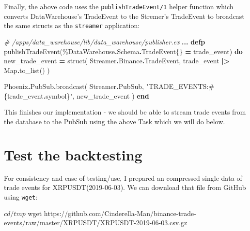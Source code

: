 \documentclass[
]{book}
\newenvironment{Shaded}{\begin{snugshade}}{\end{snugshade}}
\newcommand{\CommentTok}[1]{\textcolor[rgb]{0.56,0.35,0.01}{\textit{#1}}}
\newcommand{\ConstantTok}[1]{\textcolor[rgb]{0.00,0.00,0.00}{#1}}
\newcommand{\ExtensionTok}[1]{#1}
\newcommand{\KeywordTok}[1]{\textcolor[rgb]{0.13,0.29,0.53}{\textbf{#1}}}
\newcommand{\NormalTok}[1]{#1}
\newcommand{\OperatorTok}[1]{\textcolor[rgb]{0.81,0.36,0.00}{\textbf{#1}}}
\newcommand{\OtherTok}[1]{\textcolor[rgb]{0.56,0.35,0.01}{#1}}
\newcommand{\StringTok}[1]{\textcolor[rgb]{0.31,0.60,0.02}{#1}}
\begin{document}
Finally, the above code uses the \texttt{publishTradeEvent/1} helper function which converts DataWarehouse's TradeEvent to the Stremer's TradeEvent to broadcast the same structs as the \texttt{streamer} application:

\begin{Shaded}
\begin{Highlighting}[]
  \CommentTok{\# /apps/data\_warehouse/lib/data\_warehouse/publisher.ex}
  \OperatorTok{...}
  \KeywordTok{defp}\NormalTok{ publishTradeEvent(\%}\ConstantTok{DataWarehouse}\OperatorTok{.}\ConstantTok{Schema}\OperatorTok{.}\ConstantTok{TradeEvent}\NormalTok{\{\} }\OperatorTok{=}\NormalTok{ trade\_event) }\KeywordTok{do}
\NormalTok{    new\_trade\_event }\OperatorTok{=}
\NormalTok{      struct(}
        \ConstantTok{Streamer}\OperatorTok{.}\ConstantTok{Binance}\OperatorTok{.}\ConstantTok{TradeEvent}\NormalTok{,}
\NormalTok{        trade\_event }\OperatorTok{|\textgreater{}} \ConstantTok{Map}\OperatorTok{.}\NormalTok{to\_list()}
\NormalTok{      )}

    \ConstantTok{Phoenix}\OperatorTok{.}\ConstantTok{PubSub}\OperatorTok{.}\NormalTok{broadcast(}
      \ConstantTok{Streamer}\OperatorTok{.}\ConstantTok{PubSub}\NormalTok{,}
      \StringTok{"TRADE\_EVENTS:}\OtherTok{\#\{}\NormalTok{trade\_event}\OperatorTok{.}\NormalTok{symbol}\OtherTok{\}}\StringTok{"}\NormalTok{,}
\NormalTok{      new\_trade\_event}
\NormalTok{    )}
  \KeywordTok{end}
\end{Highlighting}
\end{Shaded}

This finishes our implementation - we should be able to stream trade events from the database to the PubSub using the above Task which we will do below.

\hypertarget{test-the-backtesting}{%
\section{Test the backtesting}\label{test-the-backtesting}}

For consistency and ease of testing/use, I prepared an compressed single data of trade events for XRPUSDT(2019-06-03). We can download that file from GitHub using \texttt{wget}:

\begin{Shaded}
\begin{Highlighting}[]
\ExtensionTok{$}\NormalTok{ cd /tmp}
\ExtensionTok{$}\NormalTok{ wget https://github.com/Cinderella{-}Man/binance{-}trade{-}events/raw/master/XRPUSDT/XRPUSDT{-}2019{-}06{-}03.csv.gz}
\end{Highlighting}
\end{Shaded}
\end{document}
